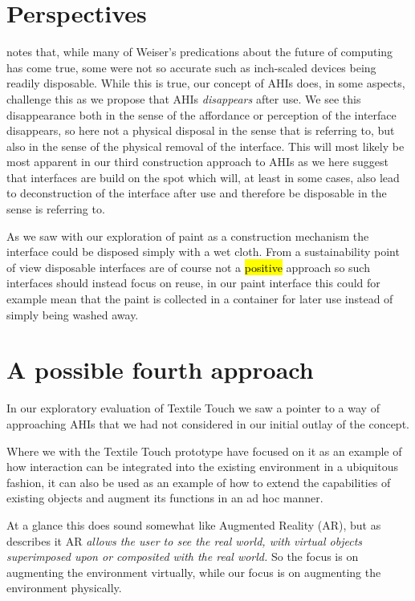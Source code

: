 \section{Perspectives}

\citet{abowd2012next} notes that, while many of Weiser's predications about the future of computing has come true, some were not so accurate such as inch-scaled devices being readily disposable.
While this is true, our concept of AHIs does, in some aspects, challenge this as we propose that AHIs \emph{disappears} after use.
We see this disappearance both in the sense of the affordance or perception of the interface disappears, so here not a physical disposal in the sense that \citeauthor{abowd2012next} is referring to, but also in the sense of the physical removal of the interface.
This will most likely be most apparent in our third construction approach to AHIs as we here suggest that interfaces are build on the spot which will, at least in some cases, also lead to deconstruction of the interface after use and therefore be disposable in the sense \citeauthor{abowd2012next} is referring to.

As we saw with our exploration of paint as a construction mechanism the interface could be disposed simply with a wet cloth.
From a sustainability point of view disposable interfaces are of course not a \hl{positive} approach so such interfaces should instead focus on reuse, in our paint interface this could for example mean that the paint is collected in a container for later use instead of simply being washed away. 

\section{A possible fourth approach}
In our exploratory evaluation of Textile Touch we saw a pointer to a way of approaching AHIs that we had not considered in our initial outlay of the concept.


Where we with the Textile Touch prototype have focused on it as an example of how interaction can be integrated into the existing environment in a ubiquitous fashion, it can also be used as an example of how to extend the capabilities of existing objects and augment its functions in an ad hoc manner.

At a glance this does sound somewhat like Augmented Reality (AR), but as \citet{azuma1997survey} describes it AR \emph{allows the user to see the real world, with virtual objects superimposed upon or composited with the real world.}
So the focus is on augmenting the environment virtually, while our focus is on augmenting the environment physically.

